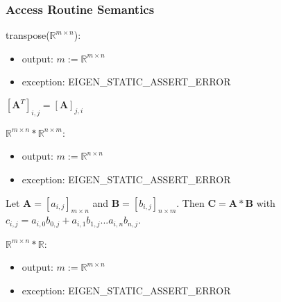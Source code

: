 \documentclass[12pt, titlepage]{article}
\begin{document}



\subsubsection{Access Routine Semantics}

\noindent transpose($\mathbb{R}^{m \times n}$):
\begin{itemize}
\item output: $m:=\mathbb{R}^{m \times n}$
\item exception: EIGEN\_STATIC\_ASSERT\_ERROR
\end{itemize}

$[\mathbf{A}^T]_{i,j} = [\mathbf{A}]_{j,i}$
\newline

\noindent $\mathbb{R}^{m \times n} * \mathbb{R}^{n \times m}$:
\begin{itemize}
\item output: $m:=\mathbb{R}^{n \times n}$
\item exception: EIGEN\_STATIC\_ASSERT\_ERROR
\end{itemize}

Let $\mathbf{A} = [a_{i,j}]_{m\times n}$ and $\mathbf{B} = [b_{i,j}]_{n\times m}$. Then $\mathbf{C} = \mathbf{A} * \mathbf{B}$ with $c_{i,j} = a_{i,0} b_{0,j} + a_{i,1} b_{1,j} ...  a_{i,n}b_{n,j}$.
\newline

\noindent $\mathbb{R}^{m \times n} * \mathbb{R}$:
\begin{itemize}
\item output: $m:=\mathbb{R}^{m \times n}$
\item exception: EIGEN\_STATIC\_ASSERT\_ERROR
\end{itemize}
\end{document}
